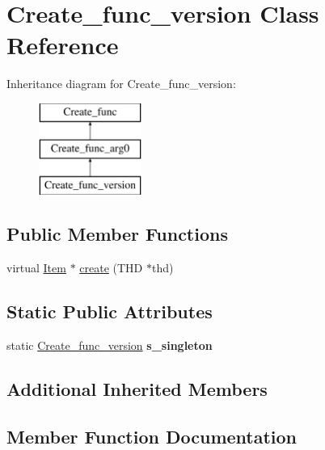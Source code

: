 \hypertarget{classCreate__func__version}{}\section{Create\+\_\+func\+\_\+version Class Reference}
\label{classCreate__func__version}
Inheritance diagram for Create\+\_\+func\+\_\+version\+:\begin{figure}[H]
\begin{center}
\leavevmode
\includegraphics[height=3.000000cm]{classCreate__func__version}
\end{center}
\end{figure}
\subsection*{Public Member Functions}
\begin{DoxyCompactItemize}
\item 
virtual \mbox{\hyperlink{classItem}{Item}} $\ast$ \mbox{\hyperlink{classCreate__func__version_ab7d76218cc0544bfe347bab6b56f988d}{create}} (T\+HD $\ast$thd)
\end{DoxyCompactItemize}
\subsection*{Static Public Attributes}
\begin{DoxyCompactItemize}
\item 
\mbox{\label{classCreate__func__version_a497a28da9aac4b4a1d1c63f5babf8120}} 
static \mbox{\hyperlink{classCreate__func__version}{Create\+\_\+func\+\_\+version}} {\bfseries s\+\_\+singleton}
\end{DoxyCompactItemize}
\subsection*{Additional Inherited Members}


\subsection{Member Function Documentation}
\mbox{\label{classCreate__func__version_ab7d76218cc0544bfe347bab6b56f988d}} 
